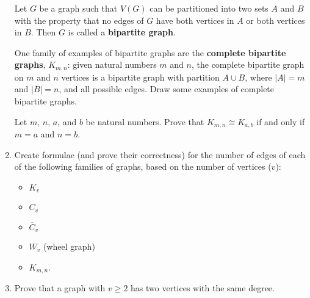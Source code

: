 \begin{exercises}
\begin{enumerate}
    Let $G$ be a graph such that $V(G)$ can be partitioned into two sets $A$ and $B$ with the property that no edges of $G$ have both vertices in $A$ or both vertices in $B$.  Then $G$ is called a \textbf{bipartite graph}.

    One family of examples of bipartite graphs are the \textbf{complete bipartite graphs}, $K_{m,n}$: given natural numbers $m$ and $n$, the complete bipartite graph on $m$ and $n$ vertices is a bipartite graph with partition $A\cup B$, where $|A| = m$ and $|B| = n$, and all possible edges.  Draw some examples of complete bipartite graphs.

    Let $m$, $n$, $a$, and $b$ be natural numbers. Prove that $K_{m,n} \cong K_{a,b}$ if and only if $m = a$ and $n = b$.

    \item Create formulae (and prove their correctness) for the number of edges of each of the following families of graphs, based on the number of vertices ($v$):
    \begin{itemize}
        \item $K_v$
        \item $C_v$
        \item $\overline{C}_v$
        \item $W_v$ (wheel graph)
        \item $K_{m,n}$.
    \end{itemize}

    \item Prove that a graph with $v \geq 2$ has two vertices with the same degree.

\end{enumerate}
\end{exercises}
